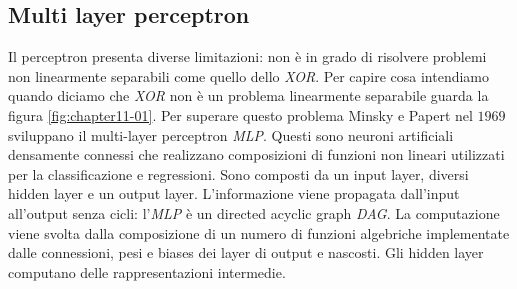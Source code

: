 	\subsection{Multi layer perceptron}
	Il perceptron presenta diverse limitazioni: non \`e in grado di risolvere problemi non linearmente separabili come quello dello \emph{XOR}. Per capire cosa intendiamo quando diciamo che \emph{XOR} non \`e un problema linearmente separabile guarda la figura \ref{fig:chapter11-01}.
	Per superare questo problema Minsky e Papert nel $1969$ sviluppano il multi-layer perceptron \emph{MLP}.
	Questi sono neuroni artificiali densamente connessi che realizzano composizioni di funzioni non lineari utilizzati per la classificazione e regressioni.
	Sono composti da un input layer, diversi hidden layer e un output layer.
	L'informazione viene propagata dall'input all'output senza cicli: l'\emph{MLP} \`e un directed acyclic graph \emph{DAG}.
	La computazione viene svolta dalla composizione di un numero di funzioni algebriche implementate dalle connessioni, pesi e biases dei layer di output e nascosti.
	Gli hidden layer computano delle rappresentazioni intermedie.


